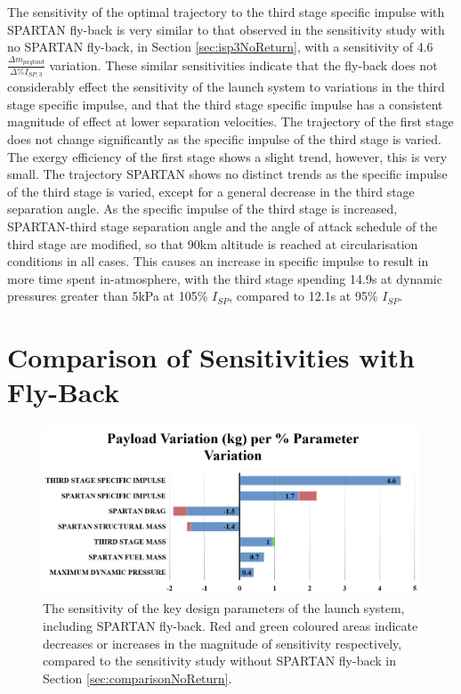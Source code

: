 The sensitivity of the optimal trajectory to the third stage specific impulse with SPARTAN fly-back is very similar to that observed in the sensitivity study with no SPARTAN fly-back, in Section \ref{sec:isp3NoReturn}, with a sensitivity of 4.6$\frac{\Delta m_{payload}}{\Delta\%I_{SP,3}}$ variation. 
 These similar sensitivities indicate that the fly-back does not considerably effect the sensitivity of the launch system to variations in the third stage specific impulse, and that the third stage specific impulse has a consistent magnitude of effect at lower separation velocities. 
The trajectory of the first stage does not change significantly as the specific impulse of the third stage is varied. 
The exergy efficiency of the first stage shows a slight trend, however, this is very small. 
The trajectory SPARTAN shows no distinct trends as the specific impulse of the third stage is varied, except for a general decrease in the third stage separation angle.
As the specific impulse of the third stage is increased, SPARTAN-third stage separation angle and the angle of attack schedule of the third stage are modified, so that 90km altitude is reached at circularisation conditions in all cases. This causes an increase in specific impulse to result in more time spent in-atmosphere, with the third stage spending 14.9s at dynamic pressures greater than 5kPa at 105\% $I_{SP}$, compared to 12.1s at 95\% $I_{SP}$. 






\section{Comparison of Sensitivities with Fly-Back}

\begin{figure}[th]
	\centering
	\includegraphics[width=0.99\linewidth]{figures/6_FlyBack/BarChart}
	\caption{The sensitivity of the key design parameters of the launch system, including SPARTAN fly-back. Red and green coloured areas indicate decreases or increases in the magnitude of sensitivity respectively, compared to the sensitivity study without SPARTAN fly-back in Section \ref{sec:comparisonNoReturn}.}
	\label{fig:BarChartreturn}
\end{figure}

